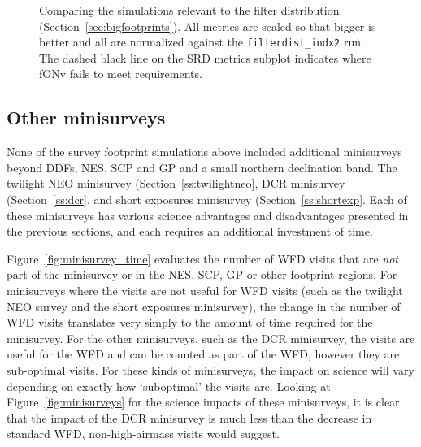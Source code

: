 \begin{figure}
\caption{Comparing the simulations relevant to the filter distribution (Section~\ref{sec:bigfootprints}). All metrics are scaled so that bigger is better and all are normalized against the {\tt filterdist\_indx2}  run. The dashed black line on the SRD metrics subplot indicates where fONv fails to meet requirements.}
\label{fig:filterdist}
\end{figure}



\subsection{Other minisurveys}\label{sec:minisurveys}

None of the survey footprint simulations above included additional minisurveys beyond DDFs, NES, SCP and GP and a small northern declination band. The twilight NEO minisurvey (Section~\ref{ss:twilightneo}, DCR minisurvey (Section~\ref{ss:dcr}, and short exposures minisurvey (Section~\ref{ss:shortexp}. Each of these minisurveys has various science advantages and disadvantages presented in the previous sections, and each requires an additional investment of time. 

Figure~\ref{fig:minisurvey_time} evaluates the number of WFD visits that are {\it not} part of the minisurvey or in the NES, SCP, GP or other footprint regions. For minisurveys where the visits are not useful for WFD visits (such as the twilight NEO survey and the short exposures minisurvey), the change in the number of WFD visits translates very simply to the amount of time required for the minisurvey. For the other minisurveys, such as the DCR minisurvey, the visits are useful for the WFD and can be counted as part of the WFD, however they are sub-optimal visits. For these kinds of minisurveys, the impact on science will vary depending on exactly how `suboptimal' the visits are. Looking at Figure~\ref{fig:minisurveys} for the science impacts of these minisurveys, it is clear that the impact of the DCR minisurvey is much less than the decrease in standard WFD, non-high-airmass visits would suggest. 

